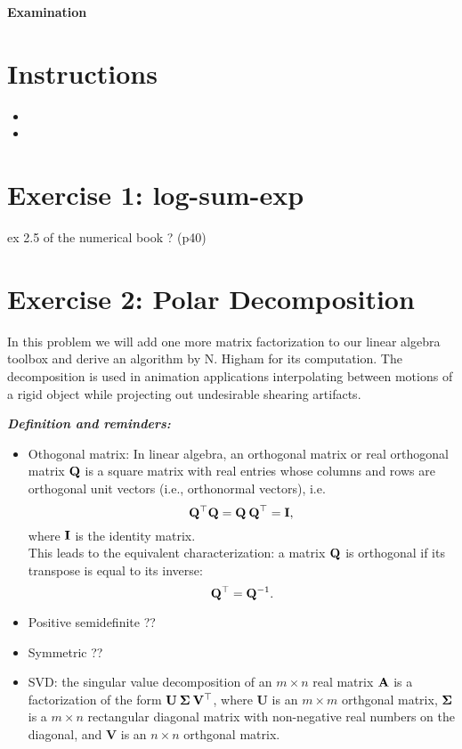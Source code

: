 

\lstset{
  language=Algo,
  basicstyle=\sffamily,
  columns=fullflexible,
  mathescape
}

\begin{center}
{\large\textbf{Examination}}\\
\end{center}

\noindent\makebox[\linewidth]{\rule{\linewidth}{0.6pt}}
 
\section{Instructions}

\begin{itemize}
\item
\item
\end{itemize}



\noindent\makebox[\linewidth]{\rule{\linewidth}{0.6pt}}

\section{Exercise 1: log-sum-exp}

ex 2.5 of the numerical book ? (p40)

\section{Exercise 2: Polar Decomposition}

In this problem we will add one more matrix factorization to our linear algebra toolbox and derive an algorithm by N. Higham for its computation.  The decomposition  is  used  in  animation  applications  interpolating  between  motions  of  a  rigid  object while projecting out undesirable shearing artifacts.

{\it\textbf{Definition and reminders:}
\begin{itemize}
\item Othogonal matrix: In linear algebra, an orthogonal matrix or real orthogonal matrix ${\bf Q}$ is a square matrix with real entries whose columns and rows are orthogonal unit vectors (i.e., orthonormal vectors), i.e.
    $${\bf Q}^\top {\bf Q} = {\bf Q \: Q}^\top = {\bf I},$$
where ${\bf I}$ is the identity matrix.\\
This leads to the equivalent characterization: a matrix ${\bf Q}$ is orthogonal if its transpose is equal to its inverse:
    $${\bf Q}^\top = {\bf Q}^{-1}.$$
\item Positive semidefinite  ??
\item Symmetric ??
\item SVD: the singular value decomposition of an $m \times n$ real matrix ${\bf A}$ is a factorization of the form  ${\bf U \: \Sigma \: V^\top}$, where {\bf U} is an $m \times m$ orthgonal matrix, ${\bf \Sigma}$ is a $m \times n$ rectangular diagonal matrix with non-negative real numbers on the diagonal, and {\bf V} is an $n \times n$ orthgonal matrix.
\end{itemize}
}
